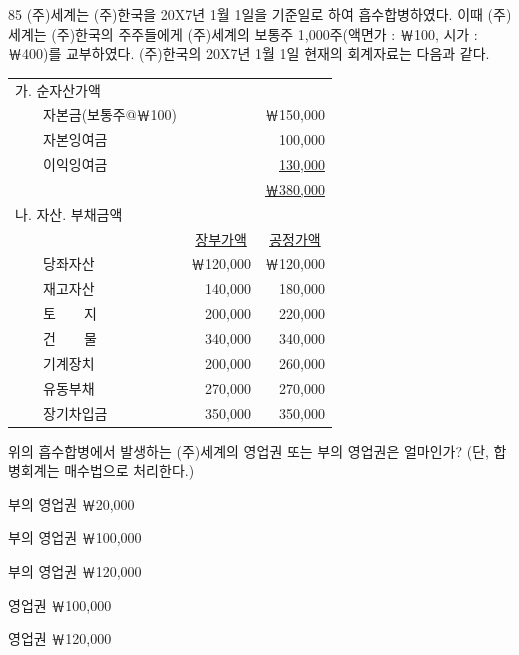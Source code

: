 \begin{question}{85}
(주)세계는 (주)한국을 20X7년 1월 1일을 기준일로 하여 흡수합병하였다. 이때 (주)세계는 (주)한국의 주주들에게 (주)세계의 보통주 1,000주(액면가 : ￦100, 시가 : ￦400)를 교부하였다. (주)한국의 20X7년 1월 1일 현재의 회계자료는 다음과 같다.

{\small\centering
\begin{tabular}{|l r r|}
\hline
\multicolumn{3}{|l|}{가. 순자산가액} \\
\ \ \ \ 자본금(보통주@￦100) & \multicolumn{2}{r|}{￦150,000} \\
\ \ \ \ 자본잉여금 & \multicolumn{2}{r|}{100,000} \\
\ \ \ \ 이익잉여금 & \multicolumn{2}{r|}{\uline{130,000}} \\
 & \multicolumn{2}{r|}{\uline{￦380,000}} \\
\multicolumn{3}{|l|}{나. 자산. 부채금액} \\
 & \multicolumn{1}{c}{\uline{장부가액}} & \multicolumn{1}{c|}{\uline{공정가액}} \\
\ \ \ \ 당좌자산 & ￦120,000 & ￦120,000 \\
\ \ \ \ 재고자산 & 140,000 & 180,000 \\
\ \ \ \ 토\ \ \ \ 지 & 200,000 & 220,000 \\
\ \ \ \ 건\ \ \ \ 물 & 340,000 & 340,000 \\
\ \ \ \ 기계장치 & 200,000 & 260,000 \\
\ \ \ \ 유동부채 & 270,000 & 270,000 \\
\ \ \ \ 장기차입금 & 350,000 & 350,000 \\
\hline
\end{tabular}\par}

위의 흡수합병에서 발생하는 (주)세계의 영업권 또는 부의 영업권은 얼마인가? (단, 합병회계는 매수법으로 처리한다.)
\begin{choices}
  \item 부의 영업권 ￦20,000
  \item 부의 영업권 ￦100,000
  \item 부의 영업권 ￦120,000
  \item 영업권 ￦100,000
  \item 영업권 ￦120,000
\end{choices}
\end{question}
